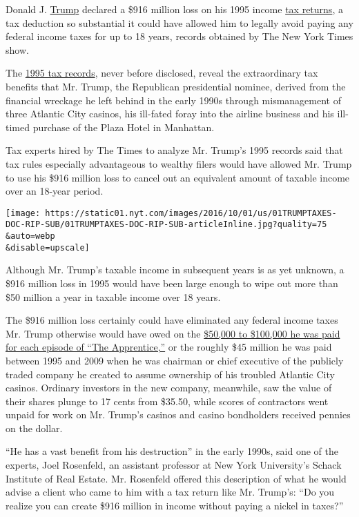Donald J.
\href{https://www.nytimes.com/2020/07/09/us/politics/trump-taxes.html}{Trump}
declared a \$916 million loss on his 1995 income
\href{https://www.nytimes.com/2020/07/15/nyregion/donald-trump-taxes-cyrus-vance.html}{tax
returns}, a tax deduction so substantial it could have allowed him to
legally avoid paying any federal income taxes for up to 18 years,
records obtained by The New York Times show.

The
\href{http://www.nytimes.com/interactive/2016/10/01/us/politics/donald-trump-taxes.html}{1995
tax records}, never before disclosed, reveal the extraordinary tax
benefits that Mr. Trump, the Republican presidential nominee, derived
from the financial wreckage he left behind in the early 1990s through
mismanagement of three Atlantic City casinos, his ill-fated foray into
the airline business and his ill-timed purchase of the Plaza Hotel in
Manhattan.

Tax experts hired by The Times to analyze Mr. Trump's 1995 records said
that tax rules especially advantageous to wealthy filers would have
allowed Mr. Trump to use his \$916 million loss to cancel out an
equivalent amount of taxable income over an 18-year period.

\texttt{[image: https://static01.nyt.com/images/2016/10/01/us/01TRUMPTAXES-DOC-RIP-SUB/01TRUMPTAXES-DOC-RIP-SUB-articleInline.jpg?quality=75\\\&auto=webp\\\&disable=upscale]}

Although Mr. Trump's taxable income in subsequent years is as yet
unknown, a \$916 million loss in 1995 would have been large enough to
wipe out more than \$50 million a year in taxable income over 18 years.

The \$916 million loss certainly could have eliminated any federal
income taxes Mr. Trump otherwise would have owed on the
\href{http://www.nytimes.com/2016/07/17/business/media/donald-trump-apprentice.html?_r=1}{\$50,000
to \$100,000 he was paid for each episode of ``The Apprentice,''} or the
roughly \$45 million he was paid between 1995 and 2009 when he was
chairman or chief executive of the publicly traded company he created to
assume ownership of his troubled Atlantic City casinos. Ordinary
investors in the new company, meanwhile, saw the value of their shares
plunge to 17 cents from \$35.50, while scores of contractors went unpaid
for work on Mr. Trump's casinos and casino bondholders received pennies
on the dollar.

``He has a vast benefit from his destruction'' in the early 1990s, said
one of the experts, Joel Rosenfeld, an assistant professor at New York
University's Schack Institute of Real Estate. Mr. Rosenfeld offered this
description of what he would advise a client who came to him with a tax
return like Mr. Trump's: ``Do you realize you can create \$916 million
in income without paying a nickel in taxes?''

